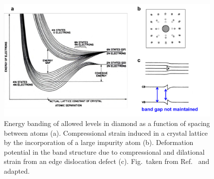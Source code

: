 \documentclass[11pt, twoside]{report}
\begin{document}
\begin{figure}[h!]
  \centering
    \includegraphics[width=1.0\textwidth]{figures/pankove_band_fluc.png}
    \caption[Energy banding of allowed levels in diamond as a function of spacing between atoms (a). Compressional strain induced in a crystal lattice by the incorporation of a large impurity atom (b). Deformation potential in the band structure due to compressional and dilational strain from an edge dislocation defect (c).]{Energy banding of allowed levels in diamond as a function of spacing between atoms (a). Compressional strain induced in a crystal lattice by the incorporation of a large impurity atom (b). Deformation potential in the band structure due to compressional and dilational strain from an edge dislocation defect (c). Fig.~taken from Ref.~ and adapted.}
  \label{pankove_band_fluc}
\end{figure}
\end{document}
